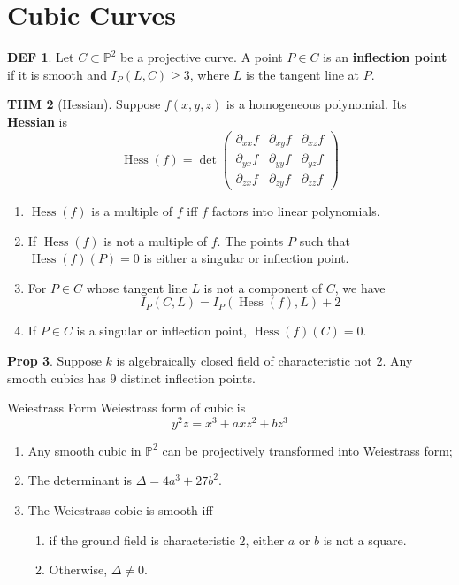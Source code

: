 \documentclass[twocolumn]{article}
\renewcommand{\emph}[1]{{\color{blue!70!black}\sffamily\bfseries #1}}
\newcommand{\p}{\partial}
\DeclareMathOperator{\Hess}{Hess}
\renewcommand{\P}{\mathbb{P}}
\theoremstyle{definition}
\newtheorem{thm}{THM}
\newtheorem{prop}[thm]{Prop}
\newtheorem{defi}[thm]{DEF}
\theoremstyle{remark}
\begin{document}
\section{Cubic Curves}

\begin{defi}
	Let $C \subset \P^2$ be a projective curve. A point $P \in C$ is an \emph{inflection point} if it is smooth and $I_P(L, C) \geq 3$, where $L$ is the tangent line at $P$.
\end{defi}

\begin{thm}[Hessian]
	Suppose $f(x, y, z)$ is a homogeneous polynomial. 
	Its \emph{Hessian} is 
	$$
	\Hess(f) = \det 
	\begin{pmatrix}
		\p_{xx} f & \p_{xy} f & \p_{xz} f \\
		\p_{yx} f & \p_{yy} f & \p_{yz} f \\
		\p_{zx} f & \p_{zy} f & \p_{zz} f
	\end{pmatrix}
	$$
	\begin{enumerate}
		\item $\Hess(f)$ is a multiple of $f$ iff $f$ factors into linear polynomials.
		\item If $\Hess(f)$ is not a multiple of $f$. The points $P$ such that $\Hess(f)(P) = 0$ is either a singular or inflection point.
		\item For $P \in C$ whose tangent line $L$ is not a component of $C$, we have 
			$$
				I_P(C, L) = I_P(\Hess(f), L) + 2
			$$
		\item If $P \in C$ is a singular or inflection point, $\Hess(f)(C) = 0$.
	\end{enumerate}

\end{thm}

\begin{prop}
	Suppose $k$ is algebraically closed field of characteristic not $2$. 
	Any smooth cubics has $9$ distinct inflection points.
\end{prop}

\begin{fthm}{Weiestrass Form}{}
	Weiestrass form of cubic is 
	$$
		y^2z = x^3 + axz^2 + b z^3
	$$
	\begin{enumerate}
		\item Any smooth cubic in $\P^2$ can be projectively transformed into Weiestrass form;
		\item The determinant is $\Delta = 4a^3 + 27b^2$.
		\item The Weiestrass cobic is smooth iff 
			\begin{enumerate}
				\item  if the ground field is characteristic $2$, either $a$ or $b$ is not a square.
				\item Otherwise, $\Delta \neq 0$.
			\end{enumerate}
	\end{enumerate}
\end{fthm}
\end{document}
